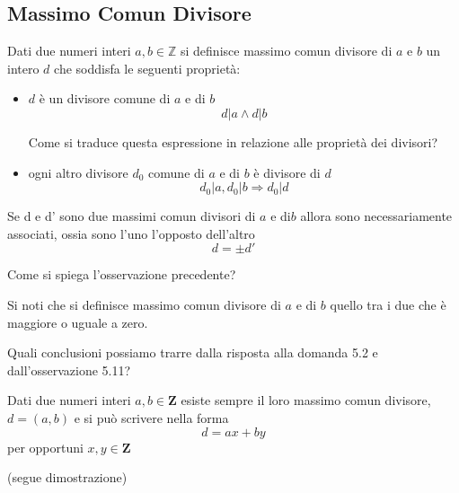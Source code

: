 \begin{flushleft}
\subsection{Massimo Comun Divisore}
\begin{definizione}
Dati due numeri interi $a, b \in \mathbb{Z}$ si definisce massimo comun divisore di $a$ e $b$ un intero $d$ che soddisfa le seguenti proprietà:
\begin{itemize}
    \item $d$ è un divisore comune di $a$ e di $b$
    \[d|a \land d|b\]
\begin{domanda}
Come si traduce questa espressione in relazione alle proprietà dei divisori?\\
\vspace{100px}
\end{domanda}
    \item ogni altro divisore $d_0$ comune di $a$ e di $b$ è divisore di $d$
    \[d_0|a, d_0|b\Rightarrow d_0|d\]
\end{itemize}
\end{definizione}
\begin{osservazione}
Se d e d' sono due massimi comun divisori di $a$ e di$b$ allora sono necessariamente associati, ossia sono l'uno l'opposto dell'altro
\[d =\pm d'\]
 \end{osservazione}
\begin{domanda}
Come si spiega l'osservazione precedente?\\
\vspace{100px}
\end{domanda}

\begin{osservazione}
Si noti che si definisce {} massimo comun divisore di $a$ e di $b$ quello tra i due che è maggiore o uguale a zero.
\end{osservazione} 

\begin{domanda}
Quali conclusioni possiamo trarre dalla risposta alla domanda 5.2 e dall'osservazione 5.11?\\
\vspace{100px}
\end{domanda}

\begin{theorem}
Dati due numeri interi $a, b \in \mathbf{Z}$ esiste sempre il loro massimo comun divisore, $d = (a, b)$ e si può scrivere nella forma 
\[d = ax + by\]
per opportuni $x, y \in \mathbf{Z}$
\end{theorem}
(segue dimostrazione)\\
\vspace{250px}
 


\end{flushleft}
